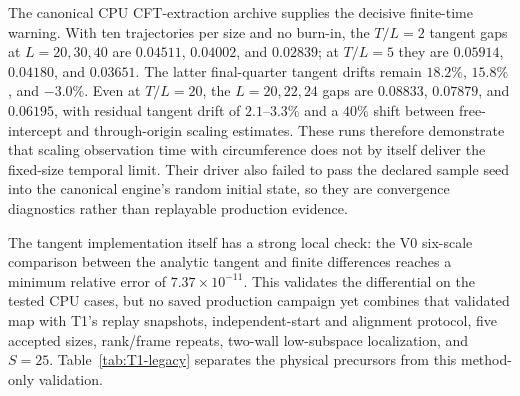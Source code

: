 \documentclass[aps,prx,twocolumn,floatfix,nofootinbib,superscriptaddress,longbibliography]{revtex4-2}
\begin{document}
The canonical CPU CFT-extraction archive supplies the decisive finite-time warning.  With
ten trajectories per size and no burn-in, the $T/L=2$ tangent gaps at $L=20,30,40$ are
$0.04511$, $0.04002$, and $0.02839$; at $T/L=5$ they are $0.05914$, $0.04180$, and
$0.03651$.  The latter final-quarter tangent drifts remain $18.2\%$, $15.8\%$, and
$-3.0\%$.  Even at $T/L=20$, the $L=20,22,24$ gaps are $0.08833$, $0.07879$, and
$0.06195$, with residual tangent drift of $2.1$--$3.3\%$ and a $40\%$ shift between
free-intercept and through-origin scaling estimates.  These runs therefore demonstrate
that scaling observation time with circumference does not by itself deliver the fixed-size
temporal limit.  Their driver also failed to pass the declared sample seed into the
canonical engine's random initial state, so they are convergence diagnostics rather than
replayable production evidence.

The tangent implementation itself has a strong local check: the V0 six-scale comparison
between the analytic tangent and finite differences reaches a minimum relative error of
$7.37\times10^{-11}$.  This validates the differential on the tested CPU cases, but no
saved production campaign yet combines that validated map with T1's replay snapshots,
independent-start and alignment protocol, five accepted sizes, rank/frame repeats, two-wall
low-subspace localization, and $S=25$.  Table~\ref{tab:T1-legacy} separates the physical
precursors from this method-only validation.
\end{document}
